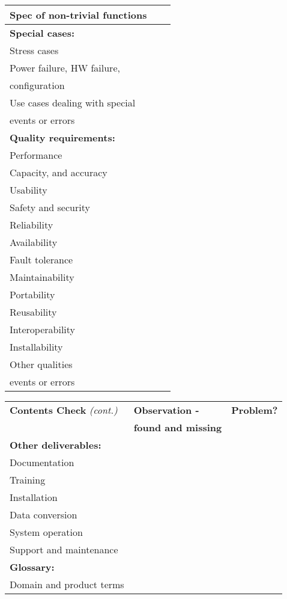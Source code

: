 \documentclass[a4paper]{article}
\begin{document}
\begin{tabular}{|l|l|l|}
		Spec of non-trivial functions	&	&	\\ \hline
		\textbf{Special cases:}	&	&	\\
		Stress cases	&	&	\\ \hline
		Power failure, HW failure,	&	&	\\
		configuration	&	&	\\ \hline
		Use cases dealing with special	&	&	\\
		events or errors	&	&	\\ \hline
		\textbf{Quality requirements:}	&	&	\\
		Performance	&	&	\\ \hline
		Capacity, and accuracy	&	&	\\ \hline
		Usability	&	&	\\ \hline
		Safety and security	&	&	\\ \hline
		Reliability	&	&	\\ \hline
		Availability	&	&	\\ \hline
		Fault tolerance	&	&	\\ \hline
		Maintainability	&	&	\\ \hline
		Portability	&	&	\\ \hline
		Reusability	&	&	\\ \hline
		Interoperability	&	&	\\ \hline
		Installability	&	&	\\ \hline
		Other qualities	&	&	\\ \hline
events or errors	&	&	\\ \hline
	\end{tabular}
	\newpage
	\begin{tabular}{|l|l|l|} \hline
		\textbf{Contents Check} \emph{(cont.)} & \textbf{Observation -} & \textbf{Problem?} \\
			& \textbf{found and missing}	&	\\ \hline
			\textbf{Other deliverables:}	&	&	\\
		Documentation	&	&	\\ \hline
		Training	&	&	\\ \hline
		Installation	&	&	\\ \hline
		Data conversion	&	&	\\ \hline
		System operation	&	&	\\ \hline
		Support and maintenance	&	&	\\ \hline
		\textbf{Glossary:}	&	&	\\
		Domain and product terms	&	&	\\ \hline
	\end{tabular}
\end{document}
